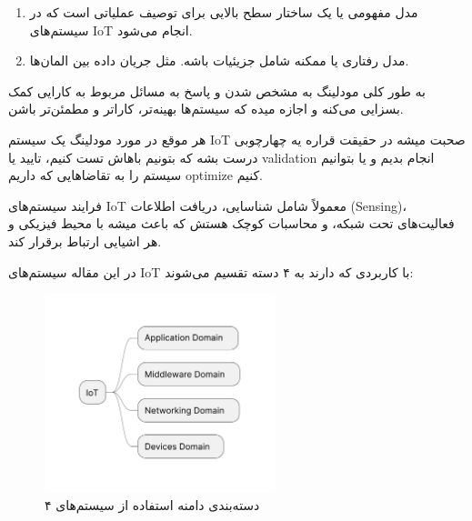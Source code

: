 \documentclass[a4paper]{article}
\begin{document}
\begin{enumerate}
    \item مدل مفهومی یا  یک ساختار سطح بالایی برای توصیف
    عملیاتی است که در سیستم‌های IoT انجام می‌شود.
    \item مدل رفتاری یا  ممکنه شامل جزیئیات باشه. مثل جریان
    داده بین المان‌ها.
\end{enumerate}

به طور کلی مودلینگ به مشخص شدن و پاسخ به مسائل مربوط به کارایی کمک بسزایی می‌کنه
و اجازه میده که سیستم‌ها بهینه‌تر، کاراتر و مطمئن‌تر باشن.

هر موقع در مورد مودلینگ یک سیستم IoT صحبت میشه در حقیقت قراره یه چهارچوبی درست
بشه که بتونیم باهاش تست کنیم، تایید یا validation انجام بدیم و یا بتوانیم سیستم
را به تقاضا‌هایی که داریم optimize کنیم.

فرایند سیستم‌های IoT معمولاً شامل شناسایی، دریافت اطلاعات (Sensing)، فعالیت‌های
تحت شبکه، و محاسبات کوچک هستش که باعث میشه با محیط فیزیکی و هر اشیایی ارتباط
برقرار کند.

در این مقاله سیستم‌های IoT با کاربردی که دارند به ۴ دسته تقسیم می‌شوند:

\begin{figure}[H]
  \centering
  \includegraphics[width=0.6\textwidth]{./figures/IoT_overall_domains.pdf}
  \caption{۴ دسته‌بندی دامنه استفاده از سیستم‌های }
  \label{fig:iotOverallDomains}
\end{figure}
\end{document}
